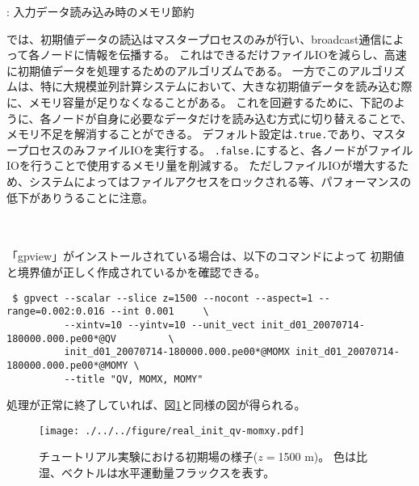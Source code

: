 \vspace{0.8cm}
: {\large 入力データ読み込み時のメモリ節約} \hrulefill

\scalerm では、初期値データの読込はマスタープロセスのみが行い、broadcast通信によって各ノードに情報を伝播する。
これはできるだけファイルIOを減らし、高速に初期値データを処理するためのアルゴリズムである。
一方でこのアルゴリズムは、特に大規模並列計算システムにおいて、大きな初期値データを読み込む際に、メモリ容量が足りなくなることがある。
これを回避するために、下記のように、各ノードが自身に必要なデータだけを読み込む方式に切り替えることで、メモリ不足を解消することができる。
%
デフォルト設定は\verb|.true.|であり、マスタープロセスのみファイルIOを実行する。
\verb|.false.|にすると、各ノードがファイルIOを行うことで使用するメモリ量を削減する。
ただしファイルIOが増大するため、システムによってはファイルアクセスをロックされる等、パフォーマンスの低下がありうることに注意。

\noindent \hrulefill\\


\vspace{0.8cm}
 \hrulefill \\
「gpview」がインストールされている場合は、以下のコマンドによって
初期値と境界値が正しく作成されているかを確認できる。

\begin{verbatim}
 $ gpvect --scalar --slice z=1500 --nocont --aspect=1 --range=0.002:0.016 --int 0.001     \
          --xintv=10 --yintv=10 --unit_vect init_d01_20070714-180000.000.pe00*@QV         \
          init_d01_20070714-180000.000.pe00*@MOMX init_d01_20070714-180000.000.pe00*@MOMY \
          --title "QV, MOMX, MOMY"
\end{verbatim}
処理が正常に終了していれば、図\ref{fig:init}と同様の図が得られる。

\begin{figure}[h]
\begin{center}
  \texttt{[image: ./../../figure/real\_init\_qv-momxy.pdf]}\\
  \caption{チュートリアル実験における初期場の様子($z=$1500 m)。
           色は比湿、ベクトルは水平運動量フラックスを表す。}
  \label{fig:init}
\end{center}
\end{figure}
